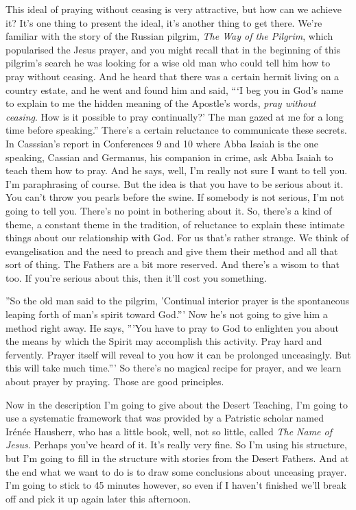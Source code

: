 This ideal of praying without ceasing is very attractive, but how can we achieve it? It's one thing to present the ideal, it's another thing to get there. We're familiar with the story of the Russian pilgrim, \emph{The Way of the Pilgrim}, which popularised the Jesus prayer, and you might recall that in the beginning of this pilgrim's search he was looking for a wise old man who could tell him how to pray without ceasing. And he heard that there was a certain hermit living on a country estate, and he went and found him and said, ```I beg you in God's name to explain to me the hidden meaning of the Apostle's words, \emph{pray without ceasing}. How is it possible to pray continually?' The man gazed at me for a long time before speaking.'' There's a certain reluctance to communicate these secrets. In Casssian's report in Conferences 9 and 10 where Abba Isaiah is the one speaking, Cassian and Germanus, his companion in crime, ask Abba Isaiah to teach them how to pray. And he says, well, I'm really not sure I want to tell you. I'm paraphrasing of course. But the idea is that you have to be serious about it. You can't throw you pearls before the swine. If somebody is not serious, I'm not going to tell you. There's no point in bothering about it. So, there's a kind of theme, a constant theme in the tradition, of reluctance to explain these intimate things about our relationship with God. For us that's rather strange. We think of evangelisation and the need to preach and give them their method and all that sort of thing. The Fathers are a bit more reserved. And there's a wisom to that too. If you're serious about this, then it'll cost you something.

''So the old man said to the pilgrim, 'Continual interior prayer is the spontaneous leaping forth of man's spirit toward God.''' Now he's not going to give him a method right away. He says, '''You have to pray to God to enlighten you about the means by which the Spirit may accomplish this activity. Pray hard and fervently. Prayer itself will reveal to you how it can be prolonged unceasingly. But this will take much time.''' So there's no magical recipe for prayer, and we learn about prayer by praying. Those are good principles.

Now in the description I'm going to give about the Desert Teaching, I'm going to use a systematic framework that was provided by a Patristic scholar named Ir\'{e}n\'{e}e Hausherr, who has a little book, well, not so little, called \emph{The Name of Jesus}. Perhaps you've heard of it. It's really very fine. So I'm using his structure, but I'm going to fill in the structure with stories from the Desert Fathers. And at the end what we want to do is to draw some conclusions about unceasing prayer. I'm going to stick to 45 minutes however, so even if I haven't finished we'll break off and pick it up again later this afternoon.

